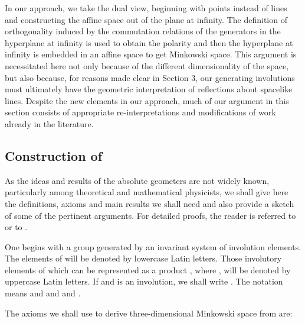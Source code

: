 \documentclass[a4paper,twoside,12pt]{article}
\def\Gs{{\cal G}}
\begin{document}
     In our approach, we take the dual view, beginning with points
instead of lines and constructing the affine space out of the plane at
infinity. The definition of orthogonality induced by the commutation
relations of the generators in the hyperplane at infinity is used to
obtain the polarity and then the hyperplane at infinity is embedded in
an affine space to get Minkowski space. This argument is necessitated
here not only because of the different dimensionality of the space,
but also because, for reasons made clear in Section 3, our generating
involutions must ultimately have the geometric interpretation of
reflections about spacelike lines.  Despite the new elements in our
approach, much of our argument in this section consists of appropriate
re-interpretations and modifications of work already in the
literature.

\subsection{Construction of \myHighlight{$\Pi$}\coordHE{}}

     As the ideas and results of the absolute geometers are not widely
known, particularly among theoretical and mathematical physicists,
we shall give here the definitions, axioms and main results we shall
need and also provide a sketch of some of the pertinent arguments. 
For detailed proofs, the reader is referred to \cite{BBPW} or to \cite{Ba}.

     One begins with a group \coordHE{} generated
by an invariant system \coordHE{} of involution elements. The elements 
of \coordHE{} will be denoted by lowercase Latin
letters. Those involutory elements of \coordHE{} which can be
represented as a product \coordHE{}, where \coordHE{}, will be denoted by
uppercase Latin letters. If \coordHE{} and \myHighlight{$\xi \eta $}\coordHE{} is
an involution, we shall write \myHighlight{$\xi |\eta$}\coordHE{}. The notation 
\myHighlight{$\xi ,\eta |\varphi ,\psi $}\coordHE{} means \myHighlight{$\xi |\varphi $}\coordHE{} and \myHighlight{$\xi |\psi $}\coordHE{} and 
\myHighlight{$\eta |\varphi$}\coordHE{} and \myHighlight{$\eta |\psi$}\coordHE{}.

     The axioms we shall use to derive three-dimensional Minkowski space
from \myHighlight{$(\mathfrak{G},\Gs)$}\coordHE{} are:
\end{document}

